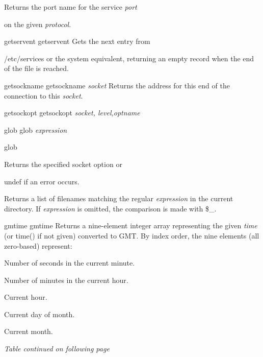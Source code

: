 \documentclass[a4paper,11pt]{book}
\begin{document}
\noindent Returns the port name for the service \textit{port}

\noindent on the given \textit{protocol}.

\noindent 

\noindent getservent getservent Gets the next entry from

\noindent /etc/services or the system equivalent, returning an empty record when the end of the file is reached.

\noindent getsockname getsockname \textit{socket }Returns the address for this end of the connection to this \textit{socket}.

\noindent getsockopt getsockopt \textit{socket, level,optname}

\noindent glob glob \textit{expression}

\noindent glob

\noindent 

\noindent Returns the specified socket option or

\noindent undef if an error occurs.

\noindent 

\noindent Returns a list of filenames matching the regular \textit{expression }in the current directory. If \textit{expression }is omitted, the comparison is made with \$\_.

\noindent gmtime gmtime Returns a nine-element integer array representing the given \textit{time }(or time() if not given) converted to GMT. By index order, the nine elements (all zero-based) represent:

 Number of seconds in the current minute.

\noindent 

\noindent 

 Number of minutes in the current hour.

\noindent 

\noindent 

 Current hour.

\noindent 

\noindent 

 Current day of month.

\noindent 

\noindent 

 Current month.

\noindent \textit{Table continued on following page}

\noindent 

\noindent 
\end{document}
